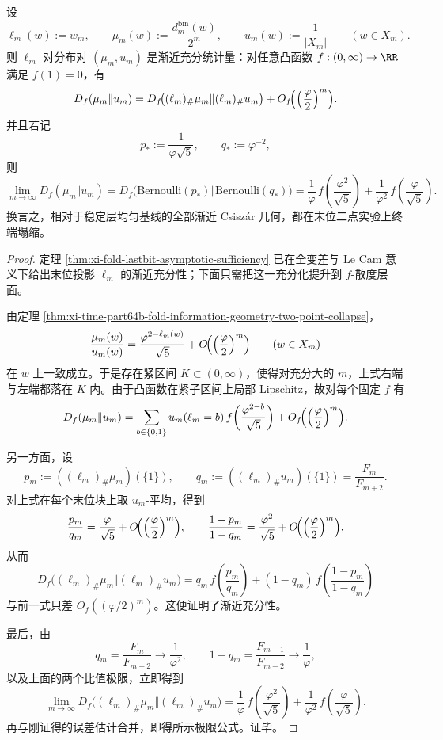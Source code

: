 \begin{theorem}[末位投影的渐近充分性与终端二点塌缩]\label{thm:xi-time-part67-lastbit-terminal-csiszar-collapse}
设
\[
\ell_m(w):=w_m,
\qquad
\mu_m(w):=\frac{d_m^{\mathrm{bin}}(w)}{2^m},
\qquad
u_m(w):=\frac{1}{|X_m|}
\qquad (w\in X_m).
\]
则 \(\ell_m\) 对分布对 \((\mu_m,u_m)\) 是渐近充分统计量：对任意凸函数 \(f:(0,\infty)\to\RR\) 满足 \(f(1)=0\)，有
\[
D_f(\mu_m\Vert u_m)
=
D_f\!\bigl((\ell_m)_\#\mu_m\Vert (\ell_m)_\#u_m\bigr)
+O_f\!\Bigl(\Bigl(\frac{\varphi}{2}\Bigr)^m\Bigr).
\]
并且若记
\[
p_*:=\frac{1}{\varphi\sqrt5},
\qquad
q_*:=\varphi^{-2},
\]
则
\[
\lim_{m\to\infty}D_f(\mu_m\Vert u_m)
=
D_f\!\bigl(\mathrm{Bernoulli}(p_*)\Vert \mathrm{Bernoulli}(q_*)\bigr)
=
\frac1\varphi\,f\!\left(\frac{\varphi^2}{\sqrt5}\right)
+
\frac1{\varphi^2}\,f\!\left(\frac{\varphi}{\sqrt5}\right).
\]
换言之，相对于稳定层均匀基线的全部渐近 Csisz\'ar 几何，都在末位二点实验上终端塌缩。
\end{theorem}
\begin{proof}
定理 \ref{thm:xi-fold-lastbit-asymptotic-sufficiency} 已在全变差与 Le Cam 意义下给出末位投影 \(\ell_m\) 的渐近充分性；下面只需把这一充分化提升到 \(f\)-散度层面。

由定理 \ref{thm:xi-time-part64b-fold-information-geometry-two-point-collapse}，
\[
\frac{\mu_m(w)}{u_m(w)}
=
\frac{\varphi^{2-\ell_m(w)}}{\sqrt5}
+O\!\Bigl(\Bigl(\frac{\varphi}{2}\Bigr)^m\Bigr)
\qquad (w\in X_m)
\]
在 \(w\) 上一致成立。于是存在紧区间 \(K\subset(0,\infty)\)，使得对充分大的 \(m\)，上式右端与左端都落在 \(K\) 内。由于凸函数在紧子区间上局部 Lipschitz，故对每个固定 \(f\) 有
\[
D_f(\mu_m\Vert u_m)
=
\sum_{b\in\{0,1\}}u_m(\ell_m=b)\,
f\!\left(\frac{\varphi^{2-b}}{\sqrt5}\right)
+O_f\!\Bigl(\Bigl(\frac{\varphi}{2}\Bigr)^m\Bigr).
\]

另一方面，设
\[
p_m:=((\ell_m)_\#\mu_m)(\{1\}),
\qquad
q_m:=((\ell_m)_\#u_m)(\{1\})=\frac{F_m}{F_{m+2}}.
\]
对上式在每个末位块上取 \(u_m\)-平均，得到
\[
\frac{p_m}{q_m}
=
\frac{\varphi}{\sqrt5}
+O\!\Bigl(\Bigl(\frac{\varphi}{2}\Bigr)^m\Bigr),
\qquad
\frac{1-p_m}{1-q_m}
=
\frac{\varphi^2}{\sqrt5}
+O\!\Bigl(\Bigl(\frac{\varphi}{2}\Bigr)^m\Bigr),
\]
从而
\[
D_f\!\bigl((\ell_m)_\#\mu_m\Vert (\ell_m)_\#u_m\bigr)
=
q_m\,f\!\left(\frac{p_m}{q_m}\right)
+(1-q_m)\,f\!\left(\frac{1-p_m}{1-q_m}\right)
\]
与前一式只差 \(O_f((\varphi/2)^m)\)。这便证明了渐近充分性。

最后，由
\[
q_m=\frac{F_m}{F_{m+2}}\longrightarrow \frac1{\varphi^2},
\qquad
1-q_m=\frac{F_{m+1}}{F_{m+2}}\longrightarrow \frac1{\varphi},
\]
以及上面的两个比值极限，立即得到
\[
\lim_{m\to\infty}D_f\!\bigl((\ell_m)_\#\mu_m\Vert (\ell_m)_\#u_m\bigr)
=
\frac1\varphi\,f\!\left(\frac{\varphi^2}{\sqrt5}\right)
+\frac1{\varphi^2}\,f\!\left(\frac{\varphi}{\sqrt5}\right).
\]
再与刚证得的误差估计合并，即得所示极限公式。证毕。
\end{proof}

